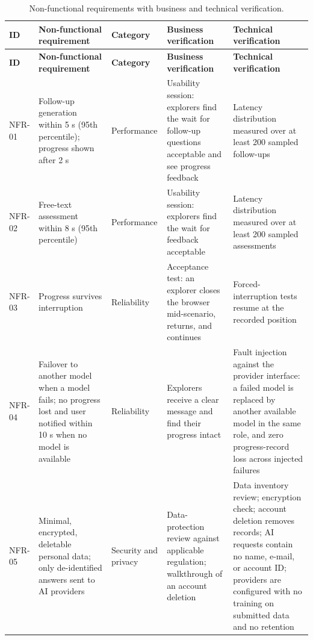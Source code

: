 {\small
\begin{longtable}{|>{\raggedright\arraybackslash}p{}|>{\raggedright\arraybackslash}p{}|>{\raggedright\arraybackslash}p{}|>{\raggedright\arraybackslash}p{}|>{\raggedright\arraybackslash}p{}|}
\caption{Non-functional requirements with business and technical verification.} \\
\hline
\textbf{ID} & \textbf{Non-functional requirement} & \textbf{Category} & \textbf{Business verification} & \textbf{Technical verification} \\ \hline
\endfirsthead
\hline
\textbf{ID} & \textbf{Non-functional requirement} & \textbf{Category} & \textbf{Business verification} & \textbf{Technical verification} \\ \hline
\endhead
NFR-01 & Follow-up generation within 5 s (95th percentile); progress shown after 2 s & Performance & Usability session: explorers find the wait for follow-up questions acceptable and see progress feedback & Latency distribution measured over at least 200 sampled follow-ups \\ \hline
NFR-02 & Free-text assessment within 8 s (95th percentile) & Performance & Usability session: explorers find the wait for feedback acceptable & Latency distribution measured over at least 200 sampled assessments \\ \hline
NFR-03 & Progress survives interruption & Reliability & Acceptance test: an explorer closes the browser mid-scenario, returns, and continues & Forced-interruption tests resume at the recorded position \\ \hline
NFR-04 & Failover to another model when a model fails; no progress lost and user notified within 10 s when no model is available & Reliability & Explorers receive a clear message and find their progress intact & Fault injection against the provider interface: a failed model is replaced by another available model in the same role, and zero progress-record loss across injected failures \\ \hline
NFR-05 & Minimal, encrypted, deletable personal data; only de-identified answers sent to AI providers & Security and privacy & Data-protection review against applicable regulation; walkthrough of an account deletion & Data inventory review; encryption check; account deletion removes records; AI requests contain no name, e-mail, or account ID; providers are configured with no training on submitted data and no retention \\ \hline

\end{longtable}}
